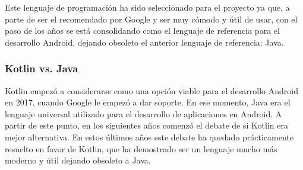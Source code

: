 Este lenguaje de programación ha sido seleccionado para el proyecto ya que, a parte de ser el recomendado por Google y ser muy cómodo y útil de usar, con el paso de los años se está consolidando como el lenguaje de referencia para el desarrollo Android, dejando obsoleto el anterior lenguaje de referencia: Java.
\subsubsection{Kotlin vs. Java}
\label{subsec:kotlinvsjava}
Kotlin empezó a considerarse como una opción viable para el desarrollo Android en 2017, cuando Google le empezó a dar soporte. En ese momento, Java era el lenguaje universal utilizado para el desarrollo de aplicaciones en Android. A partir de este punto, en los siguientes años comenzó el debate de si Kotlin era mejor alternativa. En estos últimos años este debate ha quedado prácticamente resuelto en favor de Kotlin, que ha demostrado ser un lenguaje mucho más moderno y útil dejando obsoleto a Java.

